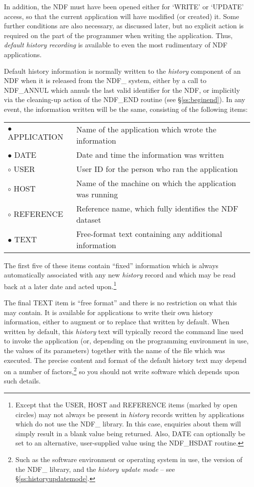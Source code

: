 \documentclass[twoside,11pt]{article}
\newcommand{\htmlref}[2]{#1}
\newcommand{\st}[1]{{\em{#1}}}
\begin{document}
In addition, the NDF must have been opened either for `WRITE' or
`UPDATE' access, so that the current application will have modified
(or created) it. Some further conditions are also necessary, as
discussed later, but no explicit action is required on the part of the
programmer when writing the application. Thus, \st{default history
recording\/} is available to even the most rudimentary of NDF
applications.

Default history information is normally written to the \st{history\/}
component of an NDF when it is released from the NDF\_ system, either
by a call to \htmlref{NDF\_ANNUL}{NDF_ANNUL} which annuls the last valid identifier for the
NDF, or implicitly via the cleaning-up action of the \htmlref{NDF\_END}{NDF_END} routine
(see \S\ref{ss:beginend}). In any event, the information written will be the
same, consisting of the following items:

\begin{center}
\begin{tabular}{l@{ -- }l}
$\bullet$ APPLICATION & Name of the application which wrote the information\\
$\bullet$ DATE & Date and time the information was written\\
$\circ$ USER & User ID for the person who ran the application\\
$\circ$ HOST & Name of the machine on which the application was running\\
$\circ$ REFERENCE & Reference name, which fully identifies the NDF
dataset\\[1ex]
$\bullet$ TEXT & Free-format text containing any additional information
\end{tabular}
\end{center}

The first five of these items contain ``fixed'' information which is
always automatically associated with any new \st{history\/} record and
which may be read back at a later date and acted upon.\footnote{Except
that the USER, HOST and REFERENCE items (marked by open circles) may
not always be present in \st{history\/} records written by applications
which do not use the NDF\_ library. In this case, enquiries about them
will simply result in a blank value being returned. Also, DATE can
optionally be set to an alternative, user-supplied value using the 
\htmlref{NDF\_HSDAT}{NDF_HSDAT} routine.}

The final TEXT item is ``free format'' and there is no restriction on
what this may contain. It is available for applications to write their
own history information, either to augment or to replace that written
by default.  When written by default, this \st{history\/} text will
typically record the command line used to invoke the application (or,
depending on the programming environment in use, the values of its
parameters) together with the name of the file which was executed.
The precise content and format of the default history text may depend
on a number of factors,\footnote{Such as the software environment or
operating system in use, the version of the NDF\_ library, and the
\st{history update mode\/} -- see \S\ref{ss:historyupdatemode}.} so you
should not write software which depends upon such details.
\end{document}
